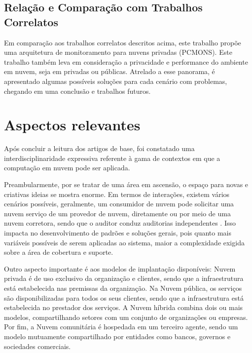 \documentclass[12pt]{article}
\begin{document}
\subsection{Relação e Comparação com Trabalhos Correlatos}

Em comparação aos trabalhos correlatos descritos acima, este trabalho propõe uma arquitetura de monitoramento para nuvens privadas (PCMONS). Este trabalho também leva em consideração a privacidade e performance do ambiente em nuvem, seja em privadas ou públicas. Atrelado a esse panorama, é apresentado algumas possíveis soluções para cada cenário com problemas, chegando em uma conclusão e trabalhos futuros.

\section{Aspectos relevantes}
Após concluir a leitura dos artigos de base, foi constatado uma interdisciplinaridade expressiva referente à gama de contextos em que a computação em nuvem pode ser aplicada.

Preambularmente, por se tratar de uma área em ascensão, o espaço para novas e criativas ideias se mostra enorme. Em termos de interações, existem vários cenários possíveis, geralmente, um consumidor de nuvem pode solicitar uma nuvem serviço de um provedor de nuvem, diretamente ou por meio de uma nuvem corretora, sendo que o auditor conduz auditorias independentes \cite{donno}. Isso impacta no desenvolvimento de padrões e soluções gerais, pois quanto mais variáveis possíveis de serem aplicadas ao sistema, maior a complexidade exigida sobre a área de cobertura e suporte.

Outro aspecto importante é aos modelos de implantação disponíveis: Nuvem privada é de uso exclusivo da organização e clientes, sendo que a infraestrutura está estabelecida nas premissas da organização. Na Nuvem pública, os serviços são disponibilizadas para todos os seus clientes, sendo que a infraestrutura está estabelecida no prestador dos serviços. A Nuvem híbrida combina dois ou mais modelos, compartilhando setores com um conjunto de organizações ou empresas. Por fim, a Nuvem comunitária é hospedada em um terceiro agente, sendo um modelo mutuamente compartilhado por entidades como bancos, governos e sociedades comerciais. 
\end{document}
